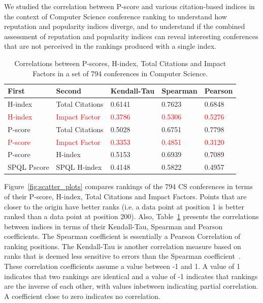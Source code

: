 \documentclass[notitlepage]{svjour3}
\begin{document}
We studied the correlation between P-score and various citation-based indices 
in the context of Computer Science conference ranking to understand how reputation
and popularity indices diverge, and to understand if the combined assessment of 
reputation and popularity indices can reveal interesting conferences that are
not perceived in the rankings produced with a single index.

\begin{table}[ht!]
  \small
  \centering
  \begin{tabular}{lllll} 
  \toprule
  First & Second & Kendall-Tau & Spearman & Pearson \\ 
  \midrule
  H-index     & Total Citations                & 0.6141 & 0.7623 & 0.6848 \\
  \textcolor{red}{H-index}     & \textcolor{red}{Impact Factor} & \textcolor{red}{0.3786} & \textcolor{red}{0.5306} & \textcolor{red}{0.5276} \\ 		
  P-score     & Total Citations                & 0.5028 & 0.6751 & 0.7798 \\
  \textcolor{red}{P-score}     & \textcolor{red}{Impact Factor} & \textcolor{red}{0.3353} & \textcolor{red}{0.4851} & \textcolor{red}{0.3120} \\ 		
  P-score     & H-index                        & 0.5153 & 0.6939 & 0.7089 \\
  SPQL Pscore & SPQL H-index                   & 0.4148 & 0.5822 & 0.4957 \\
  \bottomrule
  \end{tabular}
  \caption{Correlations between P-scores, H-index, Total Citations 
  and Impact Factors in a set of 794 conferences in Computer Science.}
  \label{tab:correlations}
\end{table}

Figure~\ref{fig:scatter_plots} compares rankings of the 794 CS conferences in terms of their
P-score, H-index, Total Citations and Impact Factors.
Points that are closer to the origin have better ranks (i.e. a data point at position 1 is 
better ranked than a data point at position 200). Also, Table~\ref{tab:correlations} presents the
correlations between indices in terms of their Kendall-Tau, Spearman and Pearson coefficients.
The Spearman coefficient is essentially a Pearson Correlation of ranking positions. The
Kendall-Tau is another correlation measure based on ranks that is deemed less
sensitive to errors than the Spearman coefficient~\cite{Kendall1955,Baeza-Yates2011}. These 
correlation coefficients assume a value between -1 and 1. A value of 1 indicates that two rankings are 
identical and a value of -1 indicates that rankings are the inverse of each other, with values 
inbetween indicating partial correlation. A coefficient close to zero indicates no correlation.
\end{document}
